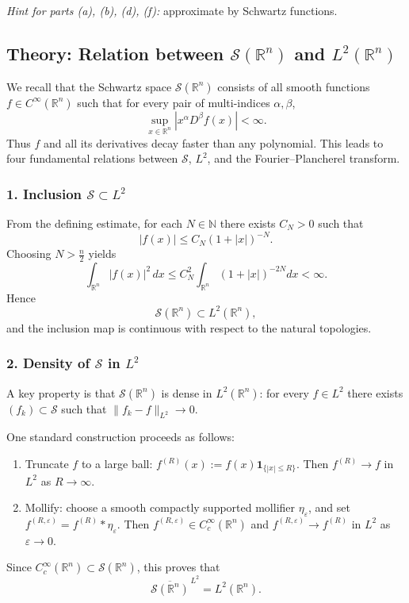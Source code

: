 \documentclass[12pt,a4paper]{article}
\theoremstyle{plain}
\theoremstyle{definition}
\theoremstyle{remark}
\theoremstyle{remark}
\begin{document}
\medskip
\noindent\emph{Hint for parts (a), (b), (d), (f):} approximate by Schwartz functions.

\subsection*{Theory: Relation between $\mathcal{S}(\mathbb{R}^n)$ and $L^{2}(\mathbb{R}^n)$}

We recall that the Schwartz space $\mathcal{S}(\mathbb{R}^n)$ consists of all
smooth functions $f\in C^\infty(\mathbb{R}^n)$ such that for every pair of
multi-indices $\alpha,\beta$,
\[
\sup_{x\in\mathbb{R}^n} |x^\alpha D^\beta f(x)| < \infty.
\]
Thus $f$ and all its derivatives decay faster than any polynomial.  This leads
to four fundamental relations between $\mathcal{S}$, $L^2$, and the
Fourier--Plancherel transform.

\subsubsection*{1. Inclusion $\mathcal{S}\subset L^2$}
From the defining estimate, for each $N\in\mathbb{N}$ there exists $C_N>0$ such
that
\[
|f(x)| \le C_N (1+|x|)^{-N}.
\]
Choosing $N>\frac{n}{2}$ yields
\[
\int_{\mathbb{R}^n} |f(x)|^2\,dx
\le C_N^2 \int_{\mathbb{R}^n} (1+|x|)^{-2N} dx < \infty.
\]
Hence
\[
\mathcal{S}(\mathbb{R}^n) \subset L^2(\mathbb{R}^n),
\]
and the inclusion map is continuous with respect to the natural topologies.

\subsubsection*{2. Density of $\mathcal{S}$ in $L^2$}
A key property is that $\mathcal{S}(\mathbb{R}^n)$ is dense in
$L^2(\mathbb{R}^n)$:
for every $f\in L^2$ there exists $(f_k)\subset\mathcal{S}$ such that
$\|f_k-f\|_{L^2}\to 0$.

One standard construction proceeds as follows:
\begin{enumerate}
	\item Truncate $f$ to a large ball:
	$f^{(R)}(x) := f(x)\mathbf{1}_{\{|x|\le R\}}$.
	Then $f^{(R)} \to f$ in $L^2$ as $R\to\infty$.
	\item Mollify: choose a smooth compactly supported mollifier $\eta_\varepsilon$,
	and set $f^{(R,\varepsilon)} = f^{(R)} * \eta_\varepsilon$.
	Then $f^{(R,\varepsilon)}\in C_c^\infty(\mathbb{R}^n)$ and
	$f^{(R,\varepsilon)}\to f^{(R)}$ in $L^2$ as $\varepsilon\to 0$.
\end{enumerate}
Since $C_c^\infty(\mathbb{R}^n)\subset\mathcal{S}(\mathbb{R}^n)$, this proves
that
\[
\overline{\mathcal{S}(\mathbb{R}^n)}^{\,L^2} = L^2(\mathbb{R}^n).
\]
\end{document}
